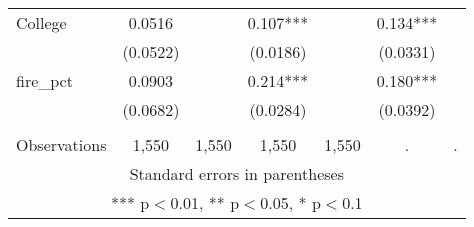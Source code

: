 \begin{tabular}{lcccccc}
College & 0.0516 &  & 0.107*** &  & 0.134*** &  \\
 & (0.0522) &  & (0.0186) &  & (0.0331) &  \\
fire\_pct & 0.0903 &  & 0.214*** &  & 0.180*** &  \\
 & (0.0682) &  & (0.0284) &  & (0.0392) &  \\
 &  &  &  &  &  &  \\
 Observations & 1,550 & 1,550 & 1,550 & 1,550 & . & . \\ \hline
\multicolumn{7}{c}{ Standard errors in parentheses} \\
\multicolumn{7}{c}{ *** p$<$0.01, ** p$<$0.05, * p$<$0.1} \\
\end{tabular}

